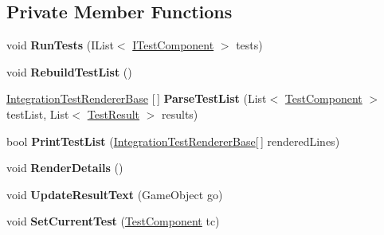 \subsection*{Private Member Functions}
\begin{DoxyCompactItemize}
\item 
\mbox{\label{class_unity_test_1_1_integration_tests_runner_window_a5c92490c51339670e04a3ed9f1cce686}} 
void {\bfseries Run\+Tests} (I\+List$<$ \hyperlink{interface_unity_test_1_1_i_test_component}{I\+Test\+Component} $>$ tests)
\item 
\mbox{\label{class_unity_test_1_1_integration_tests_runner_window_a0f101c4f3577ddc2e46166ea753bfab1}} 
void {\bfseries Rebuild\+Test\+List} ()
\item 
\mbox{\label{class_unity_test_1_1_integration_tests_runner_window_a8f1554296eba411a7a737fb919381357}} 
\hyperlink{class_unity_test_1_1_integration_test_renderer_base}{Integration\+Test\+Renderer\+Base} \mbox{[}$\,$\mbox{]} {\bfseries Parse\+Test\+List} (List$<$ \hyperlink{class_unity_test_1_1_test_component}{Test\+Component} $>$ test\+List, List$<$ \hyperlink{class_unity_test_1_1_test_result}{Test\+Result} $>$ results)
\item 
\mbox{\label{class_unity_test_1_1_integration_tests_runner_window_a163fd9c98babe1a967ed5b8285d4a465}} 
bool {\bfseries Print\+Test\+List} (\hyperlink{class_unity_test_1_1_integration_test_renderer_base}{Integration\+Test\+Renderer\+Base}\mbox{[}$\,$\mbox{]} rendered\+Lines)
\item 
\mbox{\label{class_unity_test_1_1_integration_tests_runner_window_abbc03f62fafa8005e2ab8031952ca562}} 
void {\bfseries Render\+Details} ()
\item 
\mbox{\label{class_unity_test_1_1_integration_tests_runner_window_a39f22b7095909c7b2440195c46c85992}} 
void {\bfseries Update\+Result\+Text} (Game\+Object go)
\item 
\mbox{\label{class_unity_test_1_1_integration_tests_runner_window_aab2a3aac2ab536515c3dda835a1bdeee}} 
void {\bfseries Set\+Current\+Test} (\hyperlink{class_unity_test_1_1_test_component}{Test\+Component} tc)
\end{DoxyCompactItemize}
